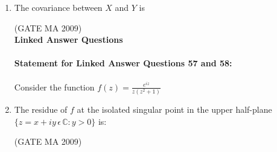 \documentclass[journal,12pt,onecolumn]{IEEEtran}
\theoremstyle{remark}
\begin{document}
\begin{enumerate}[leftmargin=0pt, align=left, start=21]
\item The covariance between $X$ and $Y$ is
\begin{enumerate}
\end{enumerate}
\hfill (GATE MA 2009)\\
\textbf{Linked Answer Questions}\\
\\
\textbf{Statement for Linked Answer Questions 57 and 58:}\\
\\
Consider the function $f(z)=\frac{e^{iz}}{z(z^2+1)}$\\
\item
The residue of $f$ at the isolated singular point in the upper half-plane $\{z=x+iy\,\epsilon\,\mathbb{C}:y>0\}$ is:
\begin{enumerate}
\end{enumerate}
\hfill (GATE MA 2009)


\end{enumerate}
\end{document}
